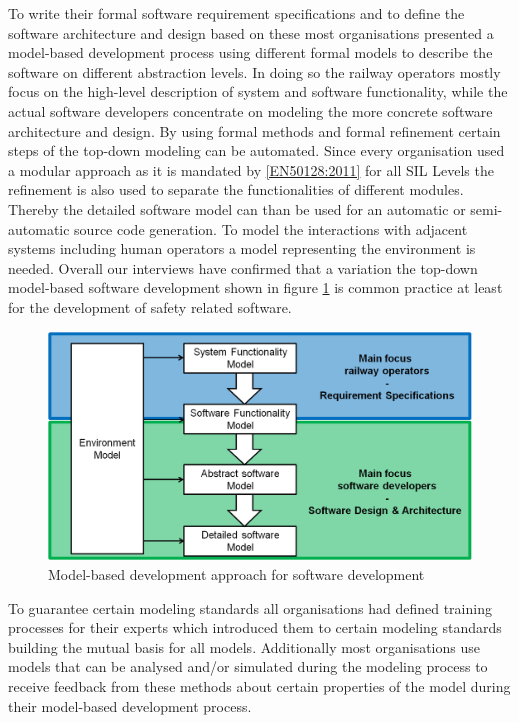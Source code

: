 \documentclass{./template/openetcs_report}
\begin{document}
To write their formal software requirement specifications and to define the software architecture and design based on these most organisations presented a model-based development process using different formal models to describe the software on different abstraction levels. In doing so the railway operators mostly focus on the high-level description of system and software functionality, while the actual software developers concentrate on modeling the more concrete software architecture and design. By using formal methods and formal refinement certain steps of the top-down modeling can be automated. Since every organisation used a modular approach as it is mandated by \ref{EN50128:2011} for all SIL Levels the refinement is also used to separate the functionalities of different modules. Thereby the detailed software model can than be used for an automatic or semi-automatic source code generation. To model the interactions with adjacent systems including human operators a model representing the environment is needed. Overall our interviews have confirmed that a variation the top-down model-based software development shown in figure \ref{fig: MBD} is common practice at least for the development of safety related software. 

\begin{figure}[h]
\centering
\includegraphics[scale=0.6]{Model-based_Approach.png}
\caption{Model-based development approach for software development}
\label{fig: MBD}
\end{figure}

To guarantee certain modeling standards all organisations had defined training processes for their experts which introduced them to certain modeling standards building the mutual basis for all models.  Additionally most organisations use models that can be analysed and/or simulated during the modeling process to receive feedback from these methods about certain properties of the model during their model-based development process.
\end{document}
